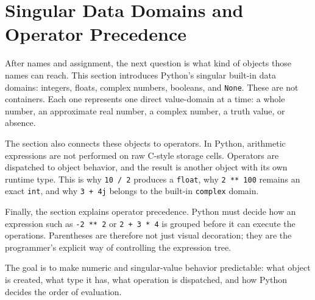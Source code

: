 \section{Singular Data Domains and Operator Precedence}

After names and assignment, the next question is what kind of objects those names can reach. This section introduces Python's singular built-in data domains: integers, floats, complex numbers, booleans, and \texttt{None}. These are not containers. Each one represents one direct value-domain at a time: a whole number, an approximate real number, a complex number, a truth value, or absence.

The section also connects these objects to operators. In Python, arithmetic expressions are not performed on raw C-style storage cells. Operators are dispatched to object behavior, and the result is another object with its own runtime type. This is why \texttt{10 / 2} produces a \texttt{float}, why \texttt{2 ** 100} remains an exact \texttt{int}, and why \texttt{3 + 4j} belongs to the built-in \texttt{complex} domain.

Finally, the section explains operator precedence. Python must decide how an expression such as \texttt{-2 ** 2} or \texttt{2 + 3 * 4} is grouped before it can execute the operations. Parentheses are therefore not just visual decoration; they are the programmer's explicit way of controlling the expression tree.

The goal is to make numeric and singular-value behavior predictable: what object is created, what type it has, what operation is dispatched, and how Python decides the order of evaluation.